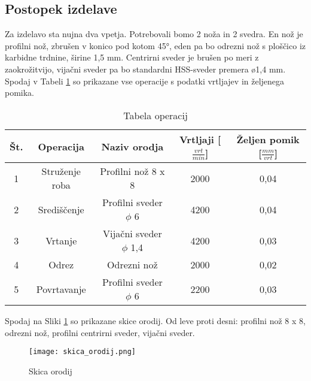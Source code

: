 \subsection{Postopek izdelave}
Za izdelavo sta nujna dva vpetja. Potrebovali bomo 2 noža in 2
svedra. En nož je profilni nož, zbrušen v konico pod kotom 45°, eden pa
bo odrezni nož s ploščico iz karbidne trdnine, širine 1,5 mm.
Centrirni sveder je brušen po meri z zaokrožitvijo, vijačni
sveder pa bo standardni HSS-sveder premera ø1,4 mm. Spodaj v Tabeli \ref{tabela_operacij}
so prikazane vse operacije s podatki vrtljajev in željenega pomika.

\begin{table}[H]
	\caption{Tabela operacij}
	\label{tabela_operacij}
	\begin{center}
		\begin{tabular}{|c|c|c|c|c|}
			\hline
			Št. & Operacija      & Naziv orodja              & Vrtljaji [\( \frac{vrt}{min}\)] & Željen pomik [\( \frac{mm}{vrt}\)] \\
			\hline
			1   & Struženje roba & Profilni nož 8 x 8        & 2000                            & 0,04                               \\
			\hline
			2   & Središčenje    & Profilni sveder $\phi$ 6  & 4200                            & 0,04                               \\
			\hline
			3   & Vrtanje        & Vijačni sveder $\phi$ 1,4 & 4200                            & 0,03                               \\
			\hline
			4   & Odrez          & Odrezni nož               & 2000                            & 0,02                               \\
			\hline
			5   & Povrtavanje    & Profilni sveder $\phi$ 6  & 2200                            & 0,03                               \\
			\hline
		\end{tabular}
	\end{center}

\end{table}

Spodaj na Sliki \ref{skica_orodij} so prikazane skice orodij.  Od leve proti desni: profilni nož 8 x 8,
odrezni nož, profilni centrirni sveder, vijačni sveder.

\begin{figure}[H]
	\begin{center}
		\texttt{[image: skica\_orodij.png]}
		\caption{Skica orodij
			\cite{lasten}}
		\label{skica_orodij}
	\end{center}
\end{figure}

